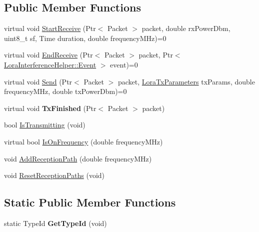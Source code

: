 \subsection*{Public Member Functions}
\begin{DoxyCompactItemize}
\item 
virtual void \hyperlink{classns3_1_1lorawan_1_1GatewayLoraPhy_a08744b321b5f1b1cf84cff8d7ca8bf49}{Start\+Receive} (Ptr$<$ Packet $>$ packet, double rx\+Power\+Dbm, uint8\+\_\+t sf, Time duration, double frequency\+M\+Hz)=0
\item 
virtual void \hyperlink{classns3_1_1lorawan_1_1GatewayLoraPhy_a030500acf630f508b12923627cdc4068}{End\+Receive} (Ptr$<$ Packet $>$ packet, Ptr$<$ \hyperlink{classns3_1_1lorawan_1_1LoraInterferenceHelper_1_1Event}{Lora\+Interference\+Helper\+::\+Event} $>$ event)=0
\item 
virtual void \hyperlink{classns3_1_1lorawan_1_1GatewayLoraPhy_a2f1375c96d37fd05f1e33e1423826299}{Send} (Ptr$<$ Packet $>$ packet, \hyperlink{structns3_1_1lorawan_1_1LoraTxParameters}{Lora\+Tx\+Parameters} tx\+Params, double frequency\+M\+Hz, double tx\+Power\+Dbm)=0
\item 
\mbox{\label{classns3_1_1lorawan_1_1GatewayLoraPhy_a0676e7b725abab9fab81c69ad0c361f5}} 
virtual void {\bfseries Tx\+Finished} (Ptr$<$ Packet $>$ packet)
\item 
bool \hyperlink{classns3_1_1lorawan_1_1GatewayLoraPhy_a9184985bc4da2d1c0cc9fedb105b20f8}{Is\+Transmitting} (void)
\item 
virtual bool \hyperlink{classns3_1_1lorawan_1_1GatewayLoraPhy_a293b678aaaf872fb1d6c0385bbab9d71}{Is\+On\+Frequency} (double frequency\+M\+Hz)
\item 
void \hyperlink{classns3_1_1lorawan_1_1GatewayLoraPhy_a5587bc3145215aad3faa2b522db5595b}{Add\+Reception\+Path} (double frequency\+M\+Hz)
\item 
void \hyperlink{classns3_1_1lorawan_1_1GatewayLoraPhy_aa964c821ed36fce6815910898ddfbb71}{Reset\+Reception\+Paths} (void)
\end{DoxyCompactItemize}
\subsection*{Static Public Member Functions}
\begin{DoxyCompactItemize}
\item 
\mbox{\label{classns3_1_1lorawan_1_1GatewayLoraPhy_ad43bcb346c3b0fba2787817014ee49d5}} 
static Type\+Id {\bfseries Get\+Type\+Id} (void)
\end{DoxyCompactItemize}
